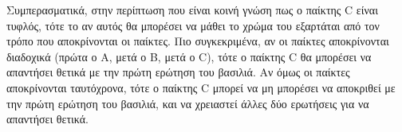 Συμπερασματικά, στην περίπτωση που είναι κοινή γνώση πως ο παίκτης C είναι τυφλός, τότε το αν αυτός θα μπορέσει να μάθει το χρώμα του εξαρτάται από τον τρόπο που αποκρίνονται οι παίκτες. Πιο συγκεκριμένα, αν οι παίκτες αποκρίνονται διαδοχικά (πρώτα ο A, μετά ο B, μετά ο C), τότε ο παίκτης C θα μπορέσει να απαντήσει θετικά με την πρώτη ερώτηση του βασιλιά. Αν όμως οι παίκτες αποκρίνονται ταυτόχρονα, τότε ο παίκτης C μπορεί να μη μπορέσει να αποκριθεί με την πρώτη ερώτηση του βασιλιά, και να χρειαστεί άλλες δύο ερωτήσεις για να απαντήσει θετικά.